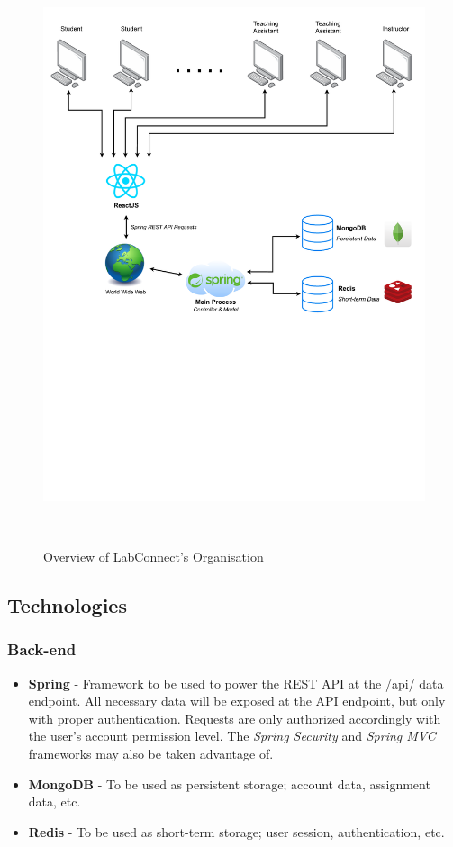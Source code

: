 \documentclass[a4paper, 12pt]{article}
\begin{document}
    \begin{figure}[H]
        \centering
        \includegraphics[width=\textwidth]{organization}
        \caption{Overview of LabConnect's Organisation}~\label{fig:organisation-diagram}
    \end{figure}
    
    \pagebreak
    
    \subsection{Technologies}
    
    \subsubsection{Back-end}
    
    \begin{itemize}
        \item \textbf{Spring} - Framework to be used to power the REST API at the /api/ data endpoint.
              All necessary data will be exposed at the API endpoint, but only with proper authentication.
              Requests are only authorized accordingly with the user's account permission level.
              The \textit{Spring Security} and \textit{Spring MVC} frameworks may also be taken advantage of.
        \item \textbf{MongoDB} - To be used as persistent storage; account data, assignment data, etc.
        \item \textbf{Redis} - To be used as short-term storage; user session, authentication, etc.
    \end{itemize}
    
\end{document}
